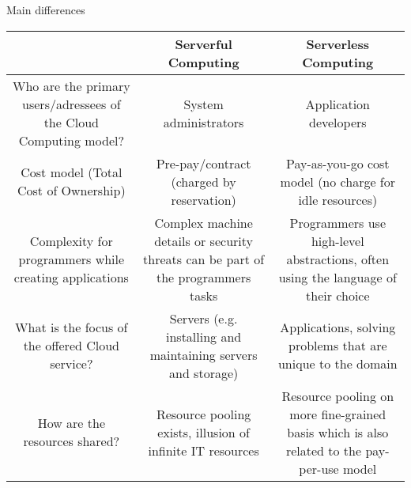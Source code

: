 \documentclass{article}
\begin{document}
Main differences\\
\begin{adjustbox}{width=1.7\textwidth,center=\textwidth}
    \begin{tabular}{ | c | c | c | }
        \hline
                                                                          & Serverful Computing                                                              & Serverless Computing                                                                       \\
        \hline

        Who are the primary users/adressees of the Cloud Computing model? & System administrators                                                            & Application developers                                                                     \\
        \hline

        Cost model (Total Cost of Ownership)                              & Pre-pay/contract (charged by reservation)                                        & Pay-as-you-go cost model (no charge for idle resources)                                    \\
        \hline

        Complexity for programmers while creating applications            & Complex machine details or security threats can be part of the programmers tasks & Programmers use high-level abstractions, often using the language of their choice          \\
        \hline

        What is the focus of the offered Cloud service?                   & Servers (e.g. installing and maintaining servers and storage)                    & Applications, solving problems that are unique to the domain                               \\
        \hline

        How are the resources shared?                                     & Resource pooling exists, illusion of infinite IT resources                       & Resource pooling on more fine-grained basis which is also related to the pay-per-use model \\
        \hline
    \end{tabular}
\end{adjustbox}
\end{document}
